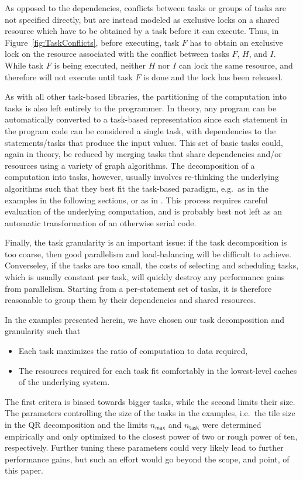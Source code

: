 \documentclass[fleqn,10pt]{wlpeerj}
\newcommand{\fig}[1]
    {Figure~\ref{fig:#1}}
\begin{document}
As opposed to the dependencies,
conflicts between tasks or groups of tasks are not specified directly,
but are instead modeled as exclusive locks on a shared resource
which have to be obtained by a task before it can execute.
Thus, in \fig{TaskConflicts}, before executing, task $F$ has
to obtain an exclusive lock on the resource associated with
the conflict between tasks $F$, $H$, and $I$.
While task $F$ is being executed, neither $H$ nor $I$ can 
lock the same resource, and therefore will not execute until
task $F$ is done and the lock has been released.

As with all other task-based libraries, the partitioning of the
computation into tasks is also left entirely to the programmer.
In theory, any program can be automatically converted to a task-based
representation since each statement in the program code
can be considered a single task, with dependencies to the
statements/tasks that produce the input values.
This set of basic tasks could, again in theory, be reduced by merging
tasks that share dependencies and/or resources using a variety
of graph algorithms.
The decomposition of a computation into tasks, however, usually
involves re-thinking the underlying algorithms such that they
best fit the task-based paradigm, e.g.~as in the examples in the
following sections, or as in \cite{ref:Gonnet2014,ref:Buttari2009,ref:Ltaief2012}.
This process requires careful evaluation of the underlying
computation, and is probably best
not left as an automatic transformation of an otherwise serial code.

Finally, the task granularity is an important issue: if the task
decomposition is too coarse, then good parallelism
and load-balancing will be difficult to achieve.
Converseley, if the tasks are too small, the costs of selecting and
scheduling tasks, which is usually constant per task, will
quickly destroy any performance gains from parallelism.
Starting from a per-statement set of tasks, it is therefore
reasonable to group them by their dependencies and shared resources.

In the examples presented herein, we have chosen our task decomposition
and granularity such that
\begin{itemize}
  \item Each task maximizes the ratio of computation to data required,
  \item The resources required for each task fit comfortably in the
    lowest-level caches of the underlying system.
\end{itemize}
\noindent The first critera is biased towards bigger tasks, while the
second limits their size.
The parameters controlling the size of the tasks in the examples, 
i.e.~the tile size in the QR decomposition and the limits $n_\mathsf{max}$
and $n_\mathsf{task}$ were determined empirically and only optimized
to the closest power of two or rough power of ten, respectively.
Further tuning these parameters could very likely lead to further
performance gains, but such an effort would go beyond the scope,
and point, of this paper.
\end{document}
